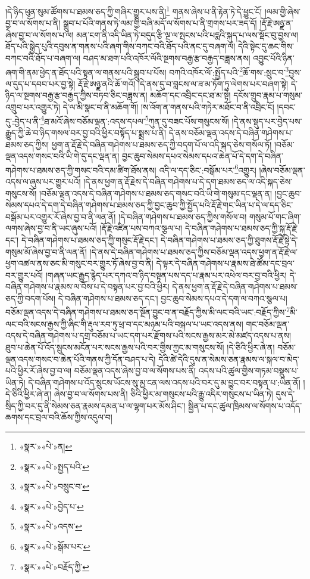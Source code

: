 །དེ་ཉིད་ཕུན་སུམ་ཚོགས་པ་ཐམས་ཅད་ཀྱི་གཞིར་གྱུར་པས་ནི།\footnote{«སྣར་»«པེ་»ན།} གནས་ཞེས་པ་ནི་རྟེན་ཏེ་དེ་ཕྱུང་ངོ། །ལམ་གྱི་ཞེས་བྱ་བ་ལ་སོགས་པ་ནི། སྒྲུབ་པ་པོའི་གནས་ཏེ་ལམ་གྱི་བཞི་མདོ་ལ་སོགས་པ་ནི་གྲགས་པར་ཟད་དོ། །རྡོ་རྗེ་ཨཉྫ་ན་ཞེས་བྱ་བ་ལ་སོགས་པ་ལ། མན་ངག་ནི་འདི་ཡིན་ཏེ་བདུད་རྩི་ལྔ་ལ་སྤངས་པའི་པདྨའི་སྐུད་པ་ལས་སྡོང་བུ་བྱས་ལ། ཐོད་པའི་སྒྱེད་པུའི་དབུས་ན་གནས་པའི་ཞག་གིས་བཀང་བའི་ཐོད་པའི་ནང་དུ་བཞག་ལ། དེའི་སྟེང་དུ་ཆང་གིས་བཀང་བའི་ཐོད་པ་བཞག་ལ། བཤད་མ་ཐག་པའི་འཁོར་ལོའི་སྔགས་བརྒྱ་རྩ་བརྒྱད་བཟླས་ནས། འབྱུང་པོའི་ཉིན་ཞག་གི་ནམ་ཕྱེད་ན་ཐོད་པའི་སྟན་ལ་གནས་པའི་སྒྲུབ་པ་པོས། བཀའི་འཁོར་ལོ་:སྤྱོད་པའི་\footnote{«སྣར་»«པེ་»སྤྱད་པའི་}ཆོ་གས་:སྲུང་བ་\footnote{«སྣར་»«པེ་»བསྲུང་བ་}བྱས་ལ་དུད་པ་དབབ་པར་བྱ་སྟེ། རྡོ་རྗེ་ཨཉྫ་ནའི་ཆོ་གའོ། །དེ་ནས་དུ་བ་བླངས་ལ་ཟ་མ་ཏོག་ཏུ་ལེགས་པར་བཞག་སྟེ། དེ་ཉིད་ལ་སྔགས་བརྒྱ་རྩ་བརྒྱད་ཀྱིས་བཏབ་ཅིང་བཟླས་ན། མཆོག་དང་འབྲིང་དང་ཐ་མ་སྟེ། དངོས་གྲུབ་རྣམ་པ་གསུམ་འགྲུབ་པར་འགྱུར་ཏེ། དེ་ལ་མི་སྣང་བ་ནི་མཆོག་གོ། །ས་འོག་ན་གནས་པའི་གཏེར་མཐོང་བ་ནི་འབྲིང་ངོ། །དབང་དུ་:བྱེད་པ་ནི་\footnote{«སྣར་»«པེ་»བྱེད་པ་}ཐ་མའོ་ཞེས་བཅོམ་ལྡན་:འདས་དཔལ་\footnote{«སྣར་»«པེ་»འདས་}ཀུན་དུ་བཟང་པོས་གསུངས་སོ། །དེ་ནས་སྡུད་པར་བྱེད་པས་རྒྱུད་ཀྱི་ཆེ་བ་ཉིད་གསལ་བར་བྱ་བའི་ཕྱིར་བསྟོད་པ་སྨྲས་པ་ནི། དེ་ནས་བཅོམ་ལྡན་འདས་དེ་བཞིན་གཤེགས་པ་ཐམས་ཅད་ཀྱིས། ཕྱག་ན་རྡོ་རྗེ་དེ་བཞིན་གཤེགས་པ་ཐམས་ཅད་ཀྱི་བདག་པོ་ལ་འདི་སྐད་ཅེས་གསོལ་ཏོ། །བཅོམ་ལྡན་འདས་གསང་བའི་ཡི་གེ་དུ་དང་ལྡན་ན། བྱང་ཆུབ་སེམས་དཔའ་སེམས་དཔའ་ཆེན་པོ་དེ་དག་དེ་བཞིན་གཤེགས་པ་ཐམས་ཅད་ཀྱི་གསང་བའི་དམ་ཚིག་ཐོས་ནས། འདི་ལ་དད་ཅིང་:བསྒོམ་པར་\footnote{«སྣར་»«པེ་»སྒོམ་པར་}འགྱུར། །ཞེས་བཅོམ་ལྡན་འདས་ལ་ཞུས་པར་གྱུར་པའོ། །དེ་ནས་ཕྱག་ན་རྡོ་རྗེས་དེ་བཞིན་གཤེགས་པ་དེ་དག་ཐམས་ཅད་ལ་འདི་སྐད་ཅེས་གསུངས་སོ། །བཅོམ་ལྡན་འདས་དེ་བཞིན་གཤེགས་པ་ཐམས་ཅད་གསང་བའི་ཡི་གེ་གསུམ་དང་ལྡན་ན། །བྱང་ཆུབ་སེམས་དཔའ་དེ་དག་དེ་བཞིན་གཤེགས་པ་ཐམས་ཅད་ཀྱི་བྱང་ཆུབ་ཀྱི་སྤྱོད་པའི་རྡོ་རྗེ་གང་ཡིན་པ་དེ་ལ་དད་ཅིང་བསྒོམ་པར་འགྱུར་རོ་ཞེས་བྱ་བ་ནི་ལན་ནོ། །དེ་བཞིན་གཤེགས་པ་ཐམས་ཅད་ཀྱིས་གསོལ་བ། གསུམ་པོ་གང་ཞིག་ལགས་ཞེས་བྱ་བ་ནི་ཡང་ཞུས་པའོ། །རྡོ་རྗེ་འཛིན་པས་བཀའ་སྩལ་པ། དེ་བཞིན་གཤེགས་པ་ཐམས་ཅད་ཀྱི་སྐུ་རྡོ་རྗེ་དང་། དེ་བཞིན་གཤེགས་པ་ཐམས་ཅད་ཀྱི་གསུང་རྡོ་རྗེ་དང་། དེ་བཞིན་གཤེགས་པ་ཐམས་ཅད་ཀྱི་ཐུགས་རྡོ་རྗེ་སྟེ་དེ་གསུམ་མོ་ཞེས་བྱ་བ་ནི་ལན་ནོ། །དེ་ནས་དེ་བཞིན་གཤེགས་པ་ཐམས་ཅད་ཀྱིས་བཅོམ་ལྡན་འདས་ཕྱག་ན་རྡོ་རྗེ་ལ་ཕྱག་འཚལ་ནས་ཅང་མི་གསུང་བར་གྱུར་ཏོ་ཞེས་བྱ་བ་ནི། དེ་ལྟར་དེ་བཞིན་གཤེགས་པ་རྣམས་ཐེ་ཚོམ་དང་བྲལ་བར་གྱུར་པའོ། །གཞན་ཡང་རྒྱུད་རྙེད་པར་དཀའ་བ་ཉིད་བསྟན་པས་དད་པ་རྣམ་པར་འཕེལ་བར་བྱ་བའི་ཕྱིར། དེ་བཞིན་གཤེགས་པ་རྣམས་ལ་བོས་པ་དེ་བསྟན་པར་བྱ་བའི་ཕྱིར། དེ་ནས་ཕྱག་ན་རྡོ་རྗེ་དེ་བཞིན་གཤེགས་པ་ཐམས་ཅད་ཀྱི་བདག་པོས། དེ་བཞིན་གཤེགས་པ་ཐམས་ཅད་དང་། བྱང་ཆུབ་སེམས་དཔའ་དེ་དག་ལ་བཀའ་སྩལ་པ། བཅོམ་ལྡན་འདས་དེ་བཞིན་གཤེགས་པ་ཐམས་ཅད་སྔོན་བྱུང་བ་ན་བརྗོད་ཀྱིས་མི་ལང་བའི་ཡང་:བརྗོད་ཀྱིས་\footnote{«སྣར་»«པེ་»བརྗོད་ཀྱི་}མི་ལང་བའི་སངས་རྒྱས་ཀྱི་ཞིང་གི་རྡུལ་རབ་ཏུ་ཕྲ་བ་དང་མཉམ་པའི་བསྐལ་པ་ཡང་འདས་ནས། གང་བཅོམ་ལྡན་འདས་དེ་བཞིན་གཤེགས་པ་དགྲ་བཅོམ་པ་ཡང་དག་པར་རྫོགས་པའི་སངས་རྒྱས་མར་མེ་མཛད་འདས་པ་ནས། ཐུབ་པ་ཆེན་པོ་འོད་སྲུངས་མངོན་པར་སངས་རྒྱས་པའི་བར་གྱིས་ཀྱང་མ་གསུངས་སོ། །དེ་ཅིའི་ཕྱིར་ཞེ་ན། བཅོམ་ལྡན་འདས་གསང་བ་ཆེན་པོའི་གནས་ཀྱི་དོན་བཤད་པ་དེ། དེའི་ཚེ་དེའི་དུས་ན་སེམས་ཅན་རྣམས་ལ་སྐལ་བ་མེད་པའི་ཕྱིར་རོ་ཞེས་བྱ་བ་ལ། བཅོམ་ལྡན་འདས་ཞེས་བྱ་བ་ལ་སོགས་པས་ནི། འདས་པའི་ཚུལ་གྱིས་གཏམ་བསྡུས་པ་ཡིན་ཏེ། དེ་བཞིན་གཤེགས་པ་འོད་སྲུངས་ཡོངས་སུ་མྱ་ངན་ལས་འདས་པའི་བར་དུ་མ་བྱུང་བར་བསྟན་པ་:ཡིན་ནོ། །དེ་ཅིའི་ཕྱིར་ཞེ་ན། ཞེས་བྱ་བ་ལ་སོགས་པས་ནི། ཅིའི་ཕྱིར་མ་གསུངས་པའི་རྒྱུ་འདིར་གསུངས་པ་ཡིན་ཏེ། དུས་དེ་སྲིད་ཀྱི་བར་དུ་ནི་སེམས་ཅན་རྣམས་དམན་པ་ལ་ལྷག་པར་མོས་ཤིང་། སྦྱིན་པ་དང་ཚུལ་ཁྲིམས་ལ་སོགས་པ་འདོད་ཆགས་དང་བྲལ་བའི་ཆོས་ཀྱིས་འདུལ་བ། 